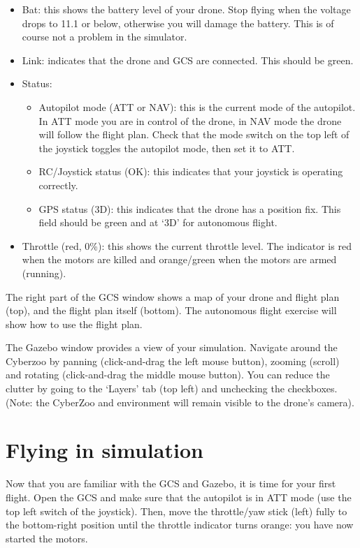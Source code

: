 \begin{itemize}
	\item Bat: this shows the battery level of your drone. Stop flying when the voltage drops to 11.1 or below, otherwise you will damage the battery. This is of course not a problem in the simulator.
	\item Link: indicates that the drone and GCS are connected. This should be green.
	\item Status:
	\begin{itemize}
		\item Autopilot mode (ATT or NAV): this is the current mode of the autopilot. In ATT mode you are in control of the drone, in NAV mode the drone will follow the flight plan. Check that the mode switch on the top left of the joystick toggles the autopilot mode, then set it to ATT.
		\item RC/Joystick status (OK): this indicates that your joystick is operating correctly.
		\item GPS status (3D): this indicates that the drone has a position fix. This field should be green and at `3D' for autonomous flight.
	\end{itemize}
	\item Throttle (red, 0\%): this shows the current throttle level. The indicator is red when the motors are killed and orange/green when the motors are armed (running).
\end{itemize}

The right part of the GCS window shows a map of your drone and flight plan (top), and the flight plan itself (bottom). The autonomous flight exercise will show how to use the flight plan.

The Gazebo window provides a view of your simulation. Navigate around the Cyberzoo by panning (click-and-drag the left mouse button), zooming (scroll) and rotating (click-and-drag the middle mouse button).
You can reduce the clutter by going to the `Layers' tab (top left) and unchecking the checkboxes. (Note: the CyberZoo and environment will remain visible to the drone's camera).

\section{Flying in simulation}

Now that you are familiar with the GCS and Gazebo, it is time for your first flight.
Open the GCS and make sure that the autopilot is in ATT mode (use the top left switch of the joystick). Then, move the throttle/yaw stick (left) fully to the bottom-right position until the throttle indicator turns orange: you have now started the motors.

